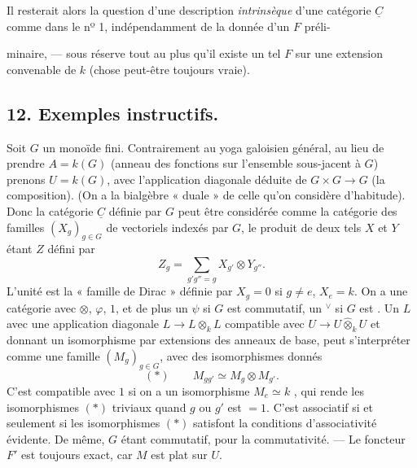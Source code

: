 \documentclass[11pt,a4paper]{article}
\begin{document}
Il resterait alors la question d'une description \emph{intrinsèque} d'une
catégorie $\underline{C}$ comme dans le nº 1, 
indépendamment de la donnée d'un $F$ préli-



minaire, --- sous réserve tout au plus qu'il existe un tel $F$ sur une extension
convenable de $k$ (chose peut-être toujours vraie).

\subsection*{12. Exemples instructifs.}

Soit $G$ un monoïde fini. Contrairement au yoga galoisien général, au lieu de
prendre $A = k(G)$ (anneau des fonctions sur l'ensemble sous-jacent à $G$)
prenons $U = k(G)$, avec l'application diagonale déduite de
$G \times G \to G$ (la composition). (On a la bialgèbre « duale »  de celle qu'on considère d'habitude). Donc la catégorie
$\underline{C}$ définie par $G$ peut être considérée comme la catégorie des
familles $(X_{g})_{g \in G}$ de vectoriels indexés par $G$, le produit
  de deux tels $X$ et $Y$ étant $Z$
défini par
\[ Z_{g} = \sum_{g'g''=g} X_{g'} \otimes Y_{g''} . \]
L'unité est la « famille de Dirac » définie par $X_{g} = 0$ si $g \neq e$,
$X_{e} = k$. On a une catégorie avec $\otimes$, $\varphi$, $1$, et de plus un
$\psi$ si $G$ est commutatif, un $^{\vee}$ si $G$ est . Un $L$
avec une application diagonale $L \to L \otimes_{k} L$ compatible avec
$U \to U \mathbin{\widehat{\otimes}}_{k} U$ et donnant un isomorphisme par
extensions des anneaux de base, peut s'interpréter comme une famille
$(M_{g})_{g \in G}$, avec des isomorphismes donnés
\[ (*) \qquad M_{gg'} \simeq M_{g} \otimes M_{g'} . \]
C'est compatible avec $1$ si on a un isomorphisme $M_{e} \simeq k$
\add{$(**)$}, qui rende les isomorphismes $(*)$ triviaux quand
\struck{\ill{}} $g$ ou $g'$ est $= 1$. C'est associatif si et seulement si les
isomorphismes $(*)$ satisfont la  conditions
d'associativité évidente. De même, $G$ étant commutatif, pour la commutativité.
--- Le foncteur $F'$ est toujours exact, car $M$ est plat sur $U$.
\end{document}
